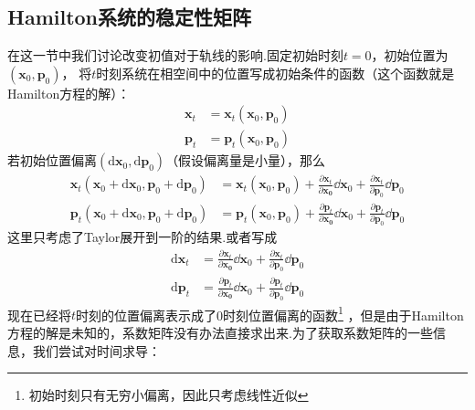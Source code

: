     \subsection{Hamilton系统的稳定性矩阵}
    在这一节中我们讨论改变初值对于轨线的影响.固定初始时刻$t=0$，初始位置为$(\bm{x}_0, \bm{p}_0)$，
    将$t$时刻系统在相空间中的位置写成初始条件的函数（这个函数就是Hamilton方程的解）：
    \begin{equation}
        \begin{split}
            \bm{x}_t &= \bm{x}_t(\bm{x}_0, \bm{p}_0)\\
            \bm{p}_t &= \bm{p}_t(\bm{x}_0, \bm{p}_0)
        \end{split}
    \end{equation}
    若初始位置偏离$(\mathrm{d}\bm{x}_0,\mathrm{d}\bm{p}_0)$（假设偏离量是小量），那么
    \begin{equation}
        \begin{split}
        \bm{x}_t(\bm{x}_0+\mathrm{d}\bm{x}_0, \bm{p}_0+\mathrm{d}\bm{p}_0) &= \bm{x}_t(\bm{x}_0, \bm{p}_0) + \frac {\partial \bm{x}_t}{\partial \bm{x_0}} \dd \bm{x}_0 + \frac {\partial \bm{x}_t}{\partial \bm{p}_0} \dd \bm{p}_0\\
        \bm{p}_t(\bm{x}_0+\mathrm{d}\bm{x}_0, \bm{p}_0+\mathrm{d}\bm{p}_0) &= \bm{p}_t(\bm{x}_0, \bm{p}_0) + \frac {\partial \bm{p}_t}{\partial \bm{x_0}} \dd \bm{x}_0 + \frac {\partial \bm{p}_t}{\partial \bm{p}_0} \dd \bm{p}_0
        \end{split}
    \end{equation}
    这里只考虑了Taylor展开到一阶的结果.或者写成
    \begin{equation}
        \begin{split}
            \mathrm{d}\bm{x}_t &= \frac {\partial \bm{x}_t}{\partial \bm{x_0}} \dd \bm{x}_0 + \frac {\partial \bm{x}_t}{\partial \bm{p}_0} \dd \bm{p}_0\\
            \mathrm{d}\bm{p}_t &= \frac {\partial \bm{p}_t}{\partial \bm{x_0}} \dd \bm{x}_0 + \frac {\partial \bm{p}_t}{\partial \bm{p}_0} \dd \bm{p}_0
        \end{split}
        \end{equation}
    现在已经将$t$时刻的位置偏离表示成了0时刻位置偏离的函数\footnote{初始时刻只有无穷小偏离，因此只考虑线性近似}
    ，但是由于Hamilton方程的解是未知的，系数矩阵没有办法直接求出来.为了获取系数矩阵的一些信息，我们尝试对时间求导：
